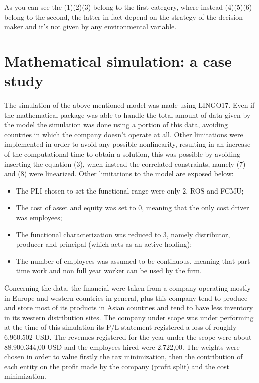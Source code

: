 \documentclass{article}
\begin{document}
As you can see the (1)(2)(3) belong to the first category, where instead (4)(5)(6) belong to the second, the latter in fact depend on the strategy of the decision maker and it's not given by any environmental variable.

\section{Mathematical simulation: a case study}
The simulation of the above-mentioned model was made using LINGO17. Even if the mathematical package was able to handle the total amount of data given by the model the simulation was done using a portion of this data, avoiding countries in which the company doesn't operate at all. Other limitations were implemented in order to avoid any possible nonlinearity, resulting in an increase of the computational time to obtain a solution, this was possible by avoiding inserting the equation (3), when instead the correlated constraints, namely (7) and (8) were linearized. Other limitations to the model are exposed below:
\begin{itemize}
    \item The PLI chosen to set the functional range were only 2, ROS and FCMU;
    \item The cost of asset and equity was set to 0, meaning that the only cost driver was employees;
    \item The functional characterization was reduced to 3, namely distributor, producer and principal (which acts as an active holding);
    \item The number of employees was assumed to be continuous, meaning that part-time work and non full year worker can be used by the firm.
\end{itemize}

Concerning the data, the financial were taken from a company operating mostly in Europe and western countries in general, plus this company tend to produce and store most of its products in Asian countries and tend to have less inventory in its western distribution sites. The company under scope was under performing at the time of this simulation its P/L statement registered a loss of roughly  6.960.502 USD. The revenues registered for the year under the scope were about 88.900.344,00 USD and the employees hired were 2.722,00.
The weights were chosen in order to value firstly the tax minimization, then the contribution of each entity on the profit made by the company (profit split) and the cost minimization.
\end{document}

